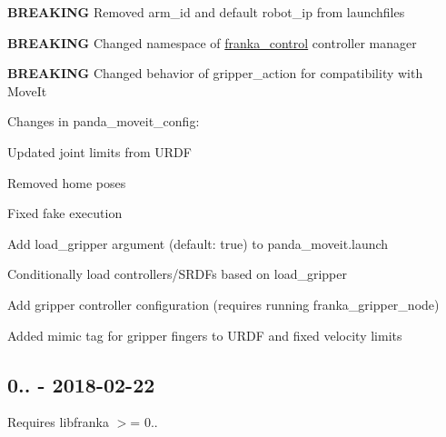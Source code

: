 \begin{DoxyItemize}
\item {\bfseries B\+R\+E\+A\+K\+I\+NG} Removed {\ttfamily arm\+\_\+id} and default {\ttfamily robot\+\_\+ip} from launchfiles
\item {\bfseries B\+R\+E\+A\+K\+I\+NG} Changed namespace of {\ttfamily \hyperlink{namespacefranka__control}{franka\+\_\+control}} controller manager
\item {\bfseries B\+R\+E\+A\+K\+I\+NG} Changed behavior of {\ttfamily gripper\+\_\+action} for compatibility with Move\+It
\item Changes in {\ttfamily panda\+\_\+moveit\+\_\+config}\+:
\begin{DoxyItemize}
\item Updated joint limits from U\+R\+DF
\item Removed {\ttfamily home} poses
\item Fixed fake execution
\item Add {\ttfamily load\+\_\+gripper} argument (default\+: {\ttfamily true}) to {\ttfamily panda\+\_\+moveit.\+launch}
\item Conditionally load controllers/\+S\+R\+D\+Fs based on {\ttfamily load\+\_\+gripper}
\item Add gripper controller configuration (requires running {\ttfamily franka\+\_\+gripper\+\_\+node})
\end{DoxyItemize}
\item Added {\ttfamily mimic} tag for gripper fingers to U\+R\+DF and fixed velocity limits
\end{DoxyItemize}

\subsection*{0.. -\/ 2018-\/02-\/22}

Requires {\ttfamily libfranka} $>$= 0..


